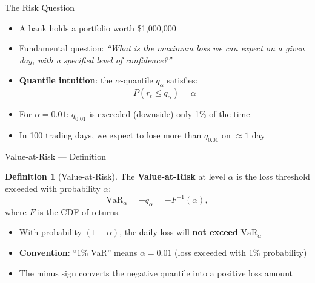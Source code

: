 \documentclass[9pt, aspectratio=169, t]{beamer}
\theoremstyle{definition}
\newtheorem{defn}{Definition}
\begin{document}
\begin{frame}{The Risk Question}
\begin{itemize}
\item A bank holds a portfolio worth \$1{,}000{,}000
\item Fundamental question: \textit{``What is the maximum loss we can expect on a given day, with a specified level of confidence?''}
\item \textbf{Quantile intuition}: the $\alpha$-quantile $q_\alpha$ satisfies:
\[
P(r_t \leq q_\alpha) = \alpha
\]
\item For $\alpha = 0.01$: $q_{0.01}$ is exceeded (downside) only 1\% of the time
\item In 100 trading days, we expect to lose more than $q_{0.01}$ on $\approx 1$ day
\end{itemize}
\end{frame}

\begin{frame}{Value-at-Risk --- Definition}
\begin{defn}[Value-at-Risk]
The \textbf{Value-at-Risk} at level $\alpha$ is the loss threshold exceeded with probability $\alpha$:
\[
\text{VaR}_\alpha = -q_\alpha = -F^{-1}(\alpha),
\]
where $F$ is the CDF of returns.
\end{defn}

\begin{itemize}
\item With probability $(1-\alpha)$, the daily loss will \textbf{not exceed} $\text{VaR}_\alpha$
\item \textbf{Convention}: ``1\% VaR'' means $\alpha = 0.01$ (loss exceeded with 1\% probability)
\item The minus sign converts the negative quantile into a positive loss amount
\end{itemize}
\end{frame}
\end{document}
